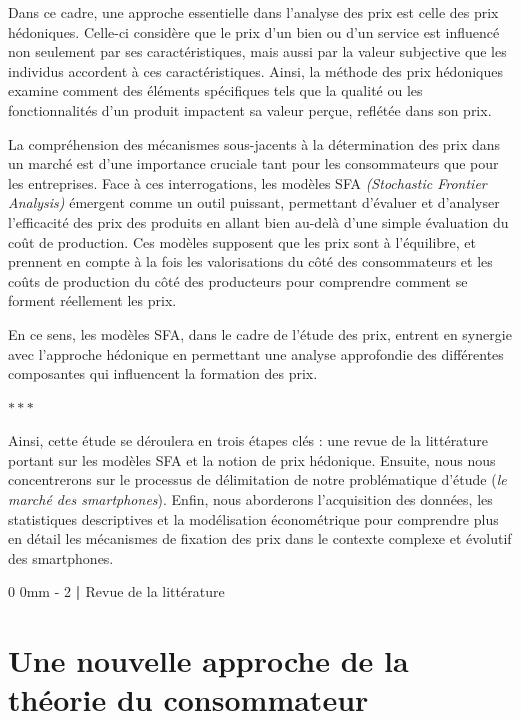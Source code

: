 \documentclass[
  12pt,
]{report}
\makeatletter
\newcommand{\macrostars}{
    \vspace{2em}
    \begin{center}
        \textcolor{highlight!80!black}{\Large{$\ast\ast\ast$}}
    \end{center}
}
\renewcommand{\chapter}{%
    \clearpage %
    \@startsection{chapter}%
    {0} %
    {0mm} %
    {-\baselineskip} %
    {2\baselineskip} %
    {\normalfont\Huge\bfseries | \Huge\bfseries}%
}
\makeatother
\begin{document}
Dans ce cadre, une approche essentielle dans l'analyse des prix est
celle des prix hédoniques. Celle-ci considère que le prix d'un bien ou
d'un service est influencé non seulement par ses caractéristiques, mais
aussi par la valeur subjective que les individus accordent à ces
caractéristiques. Ainsi, la méthode des prix hédoniques examine comment
des éléments spécifiques tels que la qualité ou les fonctionnalités d'un
produit impactent sa valeur perçue, reflétée dans son prix.

La compréhension des mécanismes sous-jacents à la détermination des prix
dans un marché est d'une importance cruciale tant pour les consommateurs
que pour les entreprises. Face à ces interrogations, les modèles SFA
\emph{(Stochastic Frontier Analysis)} émergent comme un outil puissant,
permettant d'évaluer et d'analyser l'efficacité des prix des produits en
allant bien au-delà d'une simple évaluation du coût de production. Ces
modèles supposent que les prix sont à l'équilibre, et prennent en compte
à la fois les valorisations du côté des consommateurs et les coûts de
production du côté des producteurs pour comprendre comment se forment
réellement les prix.

En ce sens, les modèles SFA, dans le cadre de l'étude des prix, entrent
en synergie avec l'approche hédonique en permettant une analyse
approfondie des différentes composantes qui influencent la formation des
prix.

\macrostars
\vspace{2em}

Ainsi, cette étude se déroulera en trois étapes clés : une revue de la
littérature portant sur les modèles SFA et la notion de prix hédonique.
Ensuite, nous nous concentrerons sur le processus de délimitation de
notre problématique d'étude (\emph{le marché des smartphones}). Enfin,
nous aborderons l'acquisition des données, les statistiques descriptives
et la modélisation économétrique pour comprendre plus en détail les
mécanismes de fixation des prix dans le contexte complexe et évolutif
des smartphones.

\chapter{Revue de la littérature}\label{revue-de-la-littuxe9rature}

\section{Une nouvelle approche de la théorie du
consommateur}\label{une-nouvelle-approche-de-la-thuxe9orie-du-consommateur}
\end{document}
